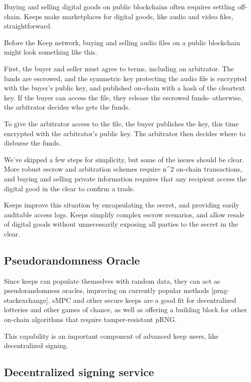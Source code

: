 \documentclass[11pt]{article}
\begin{document}
Buying and selling digital goods on public blockchains often requires settling
off-chain. Keeps make marketplaces for digital goods, like audio and video
files, straightforward.

Before the Keep network, buying and selling audio files on a public blockchain
might look something like this.

First, the buyer and seller must agree to terms, including an arbitrator. The
funds are escrowed, and the symmetric key protecting the audio file is
encrypted with the buyer’s public key, and published on-chain with a hash of
the cleartext key. If the buyer can access the file, they release the escrowed
funds- otherwise, the arbitrator decides who gets the funds.

To give the arbitrator access to the file, the buyer publishes the key, this
time encrypted with the arbitrator’s public key. The arbitrator then decides
where to disburse the funds.

We’ve skipped a few steps for simplicity, but some of the issues should be
clear. More robust escrow and arbitration schemes require n^2 on-chain
transactions, and buying and selling private information requires that any
recipient access the digital good in the clear to confirm a trade.

Keeps improve this situation by encapsulating the secret, and providing easily
auditable access logs. Keeps simplify complex escrow scenarios, and allow
resale of digital goods without unnecessarily exposing all parties to the
secret in the clear.

\subsection{Pseudorandomness Oracle}

Since keeps can populate themselves with random data, they can act as
pseudorandomness oracles, improving on currently popular methods
[prng-stackexchange]. sMPC and other secure keeps are a good fit for
decentralized lotteries and other games of chance, as well as offering a
building block for other on-chain algorithms that require tamper-resistant
pRNG.

This capability is an important component of advanced keep users, like
decentralized signing.

\subsection{Decentralized signing service}
\end{document}
